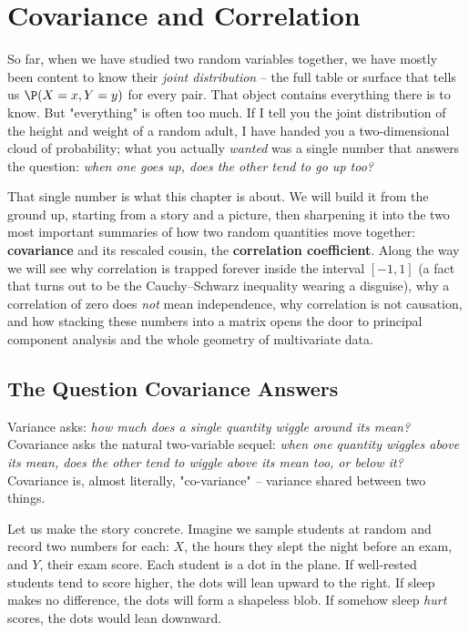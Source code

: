 \chapter{Covariance and Correlation}

So far, when we have studied two random variables together, we have mostly been
content to know their \emph{joint distribution} -- the full table or surface that
tells us $\P(X = x, Y = y)$ for every pair. That object contains everything there
is to know. But "everything" is often too much. If I tell you the joint
distribution of the height and weight of a random adult, I have handed you a
two-dimensional cloud of probability; what you actually \emph{wanted} was a single
number that answers the question: \emph{when one goes up, does the other tend to
go up too?}

That single number is what this chapter is about. We will build it from the ground
up, starting from a story and a picture, then sharpening it into the two most
important summaries of how two random quantities move together: \textbf{covariance}
and its rescaled cousin, the \textbf{correlation coefficient}. Along the way we will
see why correlation is trapped forever inside the interval $[-1, 1]$ (a fact that
turns out to be the Cauchy--Schwarz inequality wearing a disguise), why a
correlation of zero does \emph{not} mean independence, why correlation is not
causation, and how stacking these numbers into a matrix opens the door to principal
component analysis and the whole geometry of multivariate data.

\section{The Question Covariance Answers}
\label{ch14:question}

\begin{intuitionbox}
Variance asks: \emph{how much does a single quantity wiggle around its mean?}
Covariance asks the natural two-variable sequel: \emph{when one quantity wiggles
above its mean, does the other tend to wiggle above its mean too, or below it?}
Covariance is, almost literally, "co-variance" -- variance shared between two
things.
\end{intuitionbox}

Let us make the story concrete. Imagine we sample students at random and record two
numbers for each: $X$, the hours they slept the night before an exam, and $Y$,
their exam score. Each student is a dot in the plane. If well-rested students tend
to score higher, the dots will lean upward to the right. If sleep makes no
difference, the dots will form a shapeless blob. If somehow sleep \emph{hurt}
scores, the dots would lean downward.

